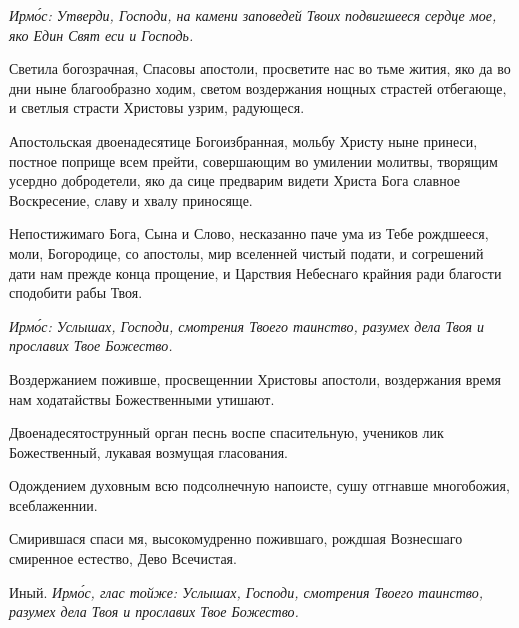 \itshape Ирм\'{о}с\normalfont{}: Утверди, Господи, на камени заповедей Твоих подвигшееся сердце мое, яко Един Свят еси и Господь. 


Светила богозрачная, Спасовы апостоли, просветите нас во тьме жития, яко да во дни ныне благообразно ходим, светом воздержания нощных страстей отбегающе, и светлыя страсти Христовы узрим, радующеся. 


Апостольская двоенадесятице Богоизбранная, мольбу Христу ныне принеси, постное поприще всем прейти, совершающим во умилении молитвы, творящим усердно добродетели, яко да сице предварим видети Христа Бога славное Воскресение, славу и хвалу приносяще. 


Непостижимаго Бога, Сына и Слово, несказанно паче ума из Тебе рождшееся, моли, Богородице, со апостолы, мир вселенней чистый подати, и согрешений дати нам прежде конца прощение, и Царствия Небеснаго крайния ради благости сподобити рабы Твоя. 



\itshape Ирм\'{о}с\normalfont{}: Услышах, Господи, смотрения Твоего таинство, разумех дела Твоя и прославих Твое Божество.


Воздержанием поживше, просвещеннии Христовы апостоли, воздержания время нам ходатайствы Божественными утишают.


Двоенадесятострунный орган песнь воспе спасительную, учеников лик Божественный, лукавая возмущая гласования.


Одождением духовным всю подсолнечную напоисте, сушу отгнавше многобожия, всеблаженнии.


Смирившася спаси мя, высокомудренно пожившаго, рождшая Вознесшаго смиренное естество, Дево Всечистая.

Иный. \itshape Ирм\'{о}с\normalfont{}, глас тойже: Услышах, Господи, смотрения Твоего таинство, разумех дела Твоя и прославих Твое Божество.

